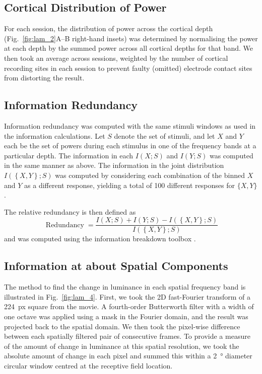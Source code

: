 \subsection{Cortical Distribution of Power}
For each session, the distribution of power across the cortical depth (Fig.~\ref{fig:lam_2}A--B right-hand insets) was determined by normalising the power at each depth by the summed power across all cortical depths for that band.
We then took an average across sessions, weighted by the number of cortical recording sites in each session to prevent faulty (omitted) electrode contact sites from distorting the result.

\subsection{Information Redundancy}
Information redundancy was computed with the same stimuli windows as used in the information calculations.
Let  $S$ denote the set of stimuli, and let  $X$ and  $Y$ each be the set of powers during each stimulus in one of the frequency bands at a particular depth.
The information in each  $I\left(X;S\right)$ and  $I(Y;S)$ was computed in the same manner as above.
The information in the joint distribution  $I(\left\{X,Y\right\};S)$ was computed by considering each combination of the binned  $X$ and  $Y$ as a different response, yielding a total of 100 different responses for  $\{X,Y\}$.

The relative redundancy is then defined as
\begin{equation*}
\operatorname{Redundancy}=\frac{I\left(X;S\right)+I\left(Y;S\right)-I\left(\left\{X,Y\right\};S\right)}{I\left(\left\{X,Y\right\};S\right)}
\end{equation*}
and was computed using the information breakdown toolbox \citep{Magri2009}.


\subsection{Information at about Spatial Components}
The method to find the change in luminance in each spatial frequency band is illustrated in Fig.~\ref{fig:lam_4}.
First, we took the 2D fast-Fourier transform of a \SI{224}{px} square from the movie.
A fourth-order Butterworth filter with a width of one octave was applied using a mask in the Fourier domain, and the result was projected back to the spatial domain.
We then took the pixel-wise difference between each spatially filtered pair of consecutive frames.
To provide a measure of the amount of change in luminance at this spatial resolution, we took the absolute amount of change in each pixel and summed this within a \SI{2}{\degree} diameter circular window centred at the receptive field location.

